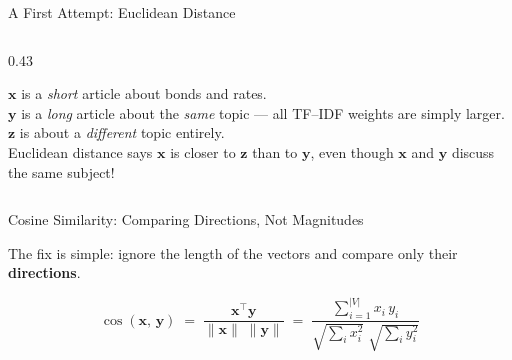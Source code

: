 \documentclass[aspectratio=169]{beamer}
\begin{document}
\begin{frame}{A First Attempt: Euclidean Distance}
\begin{columns}[T]
\begin{column}{0.43\textwidth}

\vspace{-0.3cm}
\begin{tcolorbox}[colback=red!5!white, colframe=red!70!black,
  title=\textbf{The magnitude trap}]
$\mathbf{x}$ is a \emph{short} article about bonds and rates.\\[3pt]
$\mathbf{y}$ is a \emph{long} article about the \emph{same} topic
--- all TF--IDF weights are simply larger.\\[3pt]
$\mathbf{z}$ is about a \emph{different} topic entirely.\\[6pt]
Euclidean distance says $\mathbf{x}$ is closer to $\mathbf{z}$
than to $\mathbf{y}$, even though $\mathbf{x}$ and $\mathbf{y}$
discuss the same subject!
\end{tcolorbox}

\end{column}
\end{columns}

\end{frame}
%
%
\begin{frame}{Cosine Similarity: Comparing Directions, Not Magnitudes}

The fix is simple: ignore the length of the vectors and compare
only their \textbf{directions}.

\[
  \boxed{\;
  \cos(\mathbf{x},\, \mathbf{y})
  \;=\;
  \frac{\mathbf{x}^{\!\top} \mathbf{y}}
       {\|\mathbf{x}\|\;\|\mathbf{y}\|}
  \;=\;
  \frac{\displaystyle\sum_{i=1}^{|V|} x_i \, y_i}
       {\displaystyle\sqrt{\sum_i x_i^2}\;\sqrt{\sum_i y_i^2}}
  \;}
\]
\end{frame}
%
%
\end{document}
